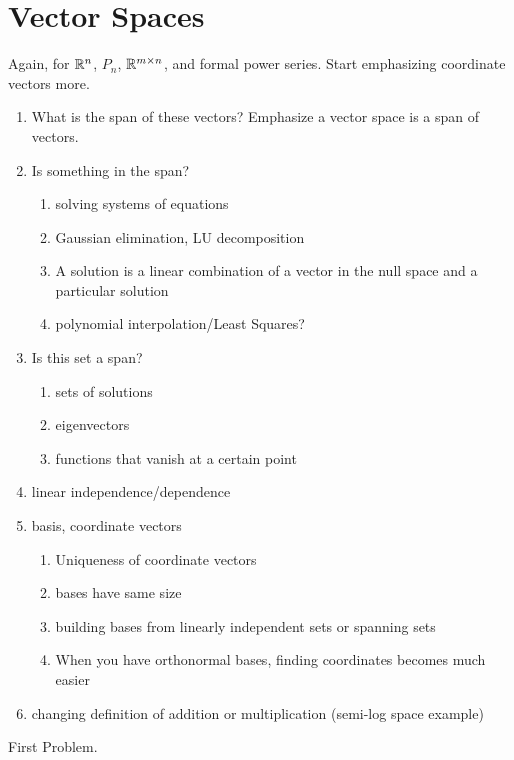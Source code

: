\chapter{Vector Spaces}

Again, for $\mathbb{R}^n$, $P_n$, $\mathbb{R}^{m\times n}$, and formal power
series. Start emphasizing coordinate vectors more.
\begin{enumerate}
\item What is the span of these vectors?  Emphasize a vector space is
  a span of vectors.

\item Is something in the span?
  \begin{enumerate}
  \item solving systems of equations
  \item Gaussian elimination, LU decomposition
  \item A solution is a linear combination of a vector in the null
    space and a particular solution
  \item polynomial interpolation/Least Squares?
  \end{enumerate}

\item Is this set a span?
  \begin{enumerate}
  \item sets of solutions
  \item eigenvectors
  \item functions that vanish at a certain point
  \end{enumerate}

\item linear independence/dependence

\item basis, coordinate vectors
  \begin{enumerate}
  \item Uniqueness of coordinate vectors
  \item bases have same size
  \item building bases from linearly independent sets or spanning sets
  \item When you have orthonormal bases, finding coordinates becomes
    much easier
  \end{enumerate}

\item changing definition of addition or multiplication (semi-log
  space example)
\end{enumerate}

\begin{problem}
  First Problem.
\end{problem}


